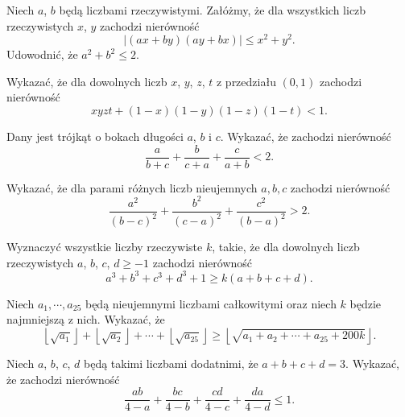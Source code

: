 
\begin{problem}{1}
	Niech $a$, $b$ będą liczbami rzeczywistymi. Załóżmy, że dla wszystkich liczb rzeczywistych $x$, $y$ zachodzi nierówność
	\[
		|(ax + by)(ay + bx)| \leqslant x^2 + y^2.
	\]
	Udowodnić, że $a^2 + b^2 \leqslant 2$.
\end{problem}

\begin{problem}{2}
Wykazać, że dla dowolnych liczb $x$, $y$, $z$, $t$ z przedziału $(0, 1)$ zachodzi nierówność
\[
	xyzt + (1 - x)(1 - y)(1 - z)(1 - t) < 1.
\]
\end{problem}

\begin{problem}{3}
Dany jest trójkąt o bokach długości $a$, $b$ i $c$. Wykazać, że zachodzi nierówność
\[
	\frac{a}{b + c} + \frac{b}{c + a} + \frac{c}{a + b} < 2.
\]
\end{problem}

\begin{problem}{4}
Wykazać, że dla parami różnych liczb nieujemnych $a,b,c$ zachodzi nierówność
\[
	\frac{a^2}{(b - c)^2} + \frac{b^2}{(c - a)^2} + \frac{c^2}{(b - a)^2} > 2.
\]
\end{problem}

\begin{problem}{5}
Wyznaczyć wszystkie liczby rzeczywiste $k$, takie, że dla dowolnych liczb rzeczywistych $a$, $b$, $c$, $d \geqslant -1$ zachodzi nierówność
\[
	a^3 + b^3 + c^3 + d^3 + 1 \geqslant k(a + b + c + d).
\]
\end{problem}

\begin{problem}{6}
Niech  $ a_1,\cdots , a_{25}$ będą nieujemnymi liczbami całkowitymi oraz niech $ k$ będzie najmniejszą z nich. Wykazać, że
\[
	\left\lfloor\sqrt{a_1}\right\rfloor + \left\lfloor\sqrt{a_2}\right\rfloor + \cdots + \left\lfloor\sqrt{a_{25}}\right\rfloor \geqslant \left\lfloor\sqrt{a_1 + a_2 + \cdots + a_{25} + 200k}\right\rfloor.
\]
\end{problem}

\begin{problem}{7}
	Niech $a$, $b$, $c$, $d$ będą takimi liczbami dodatnimi, że $a + b + c + d = 3$. Wykazać, że zachodzi nierówność
	\[
		\frac{ab}{4 - a} + \frac{bc}{4 - b} + \frac{cd}{4 - c} + \frac{da}{4 - d} \leqslant 1.
	\]
\end{problem}



